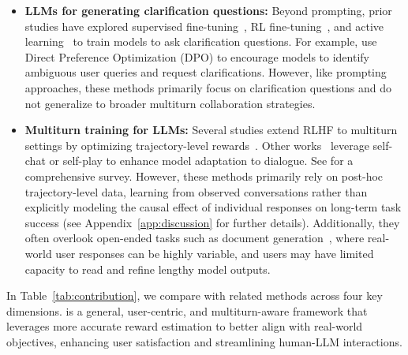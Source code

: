 \begin{itemize}
    \item \textbf{LLMs for generating clarification questions:} 
    Beyond prompting, prior studies have explored supervised fine-tuning~\citep{star_gate}, RL fine-tuning~\citep{learn_to_clarify, clarify_question_for_retrieval, circle}, and active learning~\citep{active_inquiry} to train models to ask clarification questions. For example, \citet{learn_to_clarify} use Direct Preference Optimization (DPO) to encourage models to identify ambiguous user queries and request clarifications. However, like prompting approaches, these methods primarily focus on clarification questions and do not generalize to broader multiturn collaboration strategies.
    \vspace{2pt}
    \item \textbf{Multiturn training for LLMs:} 
    Several studies extend RLHF to multiturn settings by optimizing trajectory-level rewards~\citep{multiturn_rlhf, archer, refuel, mt_preference}. Other works~\citep{baize, ppdpp} leverage self-chat or self-play to enhance model adaptation to dialogue. See \citet{mt_survey} for a comprehensive survey. However, these methods primarily rely on post-hoc trajectory-level data, learning from observed conversations rather than explicitly modeling the causal effect of individual responses on long-term task success (see Appendix~\ref{app:discussion} for further details). Additionally, they often overlook open-ended tasks such as document generation~\citep{interactive_text_gen, into_the_unknown}, where real-world user responses can be highly variable, and users may have limited capacity to read and refine lengthy model outputs.
    
\end{itemize}

In Table~\ref{tab:contribution}, we compare \name{} with related methods across four key dimensions. 
\name{} is a general, user-centric, and multiturn-aware framework that leverages more accurate reward estimation to better align with real-world objectives, enhancing user satisfaction and streamlining human-LLM interactions.

